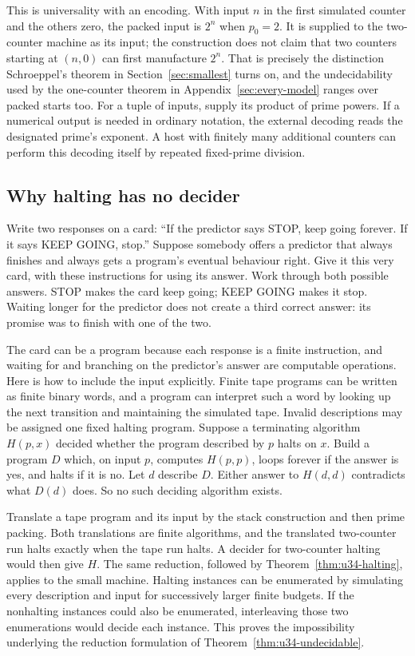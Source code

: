 \documentclass[11pt,twoside]{article}
\theoremstyle{thielethm}
\theoremstyle{thieledef}
\theoremstyle{thieledef}
\theoremstyle{thieledef}
\theoremstyle{thielethm}
\theoremstyle{thieleobs}
\theoremstyle{thielethm}
\begin{document}
This is universality with an encoding. With input $n$ in the first simulated counter
and the others zero, the packed input is $2^n$ when $p_0=2$. It is supplied to the
two-counter machine as its input; the construction does not claim that two counters
starting at $(n,0)$ can first manufacture $2^n$. That is precisely the distinction
Schroeppel's theorem in Section~\ref{sec:smallest} turns on, and the undecidability used by the
one-counter theorem in Appendix~\ref{sec:every-model} ranges over packed starts too.
For a tuple of inputs, supply its product of prime powers. If a numerical output is
needed in ordinary notation, the external decoding reads the designated prime's
exponent. A host with finitely many additional counters can perform this decoding itself
by repeated fixed-prime division.

\subsection{Why halting has no decider}

Write two responses on a card: ``If the predictor says STOP, keep going forever.
If it says KEEP GOING, stop.'' Suppose somebody offers a predictor that always
finishes and always gets a program's eventual behaviour right. Give it this very
card, with these instructions for using its answer. Work through both possible
answers. STOP makes the card keep going; KEEP GOING makes it stop. Waiting longer
for the predictor does not create a third correct answer: its promise was to
finish with one of the two.

The card can be a program because each response is a finite instruction, and
waiting for and branching on the predictor's answer are computable operations.
Here is how to include the input explicitly. Finite tape programs can be written
as finite binary words, and a program can interpret such a word by looking up
the next transition and maintaining the simulated tape.
Invalid descriptions may be assigned one fixed halting program. Suppose a terminating
algorithm $H(p,x)$ decided whether the program described by $p$ halts on $x$.
Build a program $D$ which, on input $p$, computes $H(p,p)$, loops forever if the answer
is yes, and halts if it is no. Let $d$ describe $D$. Either answer to $H(d,d)$ contradicts
what $D(d)$ does. So no such deciding algorithm exists.

Translate a tape program and its input by the stack construction and then prime packing.
Both translations are finite algorithms, and the translated two-counter run halts exactly
when the tape run halts. A decider for two-counter halting would then give $H$.
The same reduction, followed by Theorem~\ref{thm:u34-halting}, applies to the small machine.
Halting instances can be enumerated by simulating every description and input for successively
larger finite budgets. If the nonhalting instances could also be enumerated, interleaving
those two enumerations would decide each instance. This proves the impossibility underlying
the reduction formulation of Theorem~\ref{thm:u34-undecidable}.
\end{document}
